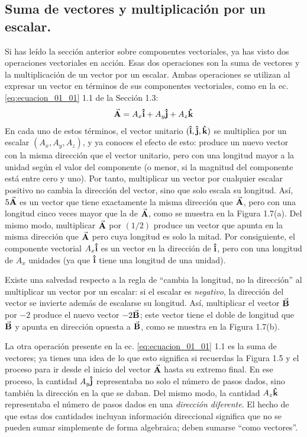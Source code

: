 \documentclass[hidelinks,12pt]{article}
\begin{document}
\subsection{Suma de vectores y multiplicación por un escalar.}

Si has leído la sección anterior sobre componentes vectoriales, ya has visto dos operaciones vectoriales en acción. Esas dos operaciones son la suma de vectores y la multiplicación de un vector por un escalar. Ambas operaciones se utilizan al expresar un vector en términos de sus componentes vectoriales, como en la ec. \ref{eq:ecuacion_01_01} 1.1 de la Sección 1.3:
\begin{align*}
\va{A} = A_{x} \vu{i} + A_{y} \vu{j} + A_{z} \vu{k}
\end{align*}
En cada uno de estos términos, el vector unitario $(\vu{i}, \vu{j}, \vu{k})$ se multiplica por un escalar $(A_{x}, A_{y}, A_{z})$, y ya conoces el efecto de esto: produce un nuevo vector con la misma dirección que el vector unitario, pero con una longitud mayor a la unidad según el valor del componente (o menor, si la magnitud del componente está entre cero y uno). Por tanto, multiplicar un vector por cualquier escalar positivo no cambia la dirección del vector, sino que solo escala su longitud. Así, $5 \va{A}$ es un vector que tiene exactamente la misma dirección que $\va{A}$, pero con una longitud cinco veces mayor que la de $\va{A}$, como se muestra en la Figura 1.7(a). Del mismo modo, multiplicar $\va{A}$ por $(1/2)$ produce un vector que apunta en la misma dirección que $\va{A}$ pero cuya longitud es solo la mitad. Por consiguiente, el componente vectorial $A_{x} \vu{i}$ es un vector en la dirección de $\vu{i}$, pero con una longitud de $A_{x}$ unidades (ya que $\vu{i}$ tiene una longitud de una unidad).
\par
Existe una salvedad respecto a la regla de \enquote{cambia la longitud, no la dirección} al multiplicar un vector por un escalar: si el escalar es \textit{negativo}, la dirección del vector se invierte además de escalarse su longitud. Así, multiplicar el vector $\va{B}$ por $-2$ produce el nuevo vector $-2 \va{B}$; este vector tiene el doble de longitud que $\va{B}$ y apunta en dirección opuesta a $\va{B}$, como se muestra en la Figura 1.7(b).
\par
La otra operación presente en la ec. \ref{eq:ecuacion_01_01} 1.1 es la suma de vectores; ya tienes una idea de lo que esto significa si recuerdas la Figura 1.5 y el proceso para ir desde el inicio del vector $\va{A}$ hasta su extremo final. En ese proceso, la cantidad $A_{y} \vu{j}$ representaba no solo el número de pasos dados, sino también la dirección en la que se daban. Del mismo modo, la cantidad $A_{z} \vu{k}$ representaba el número de pasos dados en una \textit{dirección diferente}. El hecho de que estas dos cantidades incluyan información direccional significa que no se pueden sumar simplemente de forma algebraica; deben sumarse \enquote{como vectores}.
\end{document}
